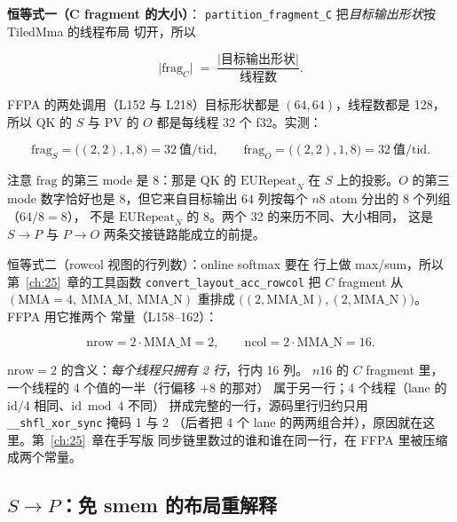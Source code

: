 \textbf{恒等式一（C fragment 的大小）}：
\texttt{partition\_\allowbreak{}fragment\_\allowbreak{}C} 把\emph{目标输出形状}按 TiledMma 的线程布局
切开，所以

\begin{equation}
  \bigl|\mathrm{frag}_C\bigr| \;=\;
  \frac{\bigl|\text{目标输出形状}\bigr|}{\text{线程数}} .
  \label{eq:26-csize}
\end{equation}

FFPA 的两处调用（L152 与 L218）目标形状都是 $(64,64)$，线程数都是 128，
所以 QK 的 $S$ 与 PV 的 $O$ 都是每线程 32 个 f32。实测：

\begin{equation}
  \mathrm{frag}_S = \bigl((2,2),1,8\bigr) = 32\ \text{值/tid},\qquad
  \mathrm{frag}_O = \bigl((2,2),1,8\bigr) = 32\ \text{值/tid} .
  \label{eq:26-frag32}
\end{equation}

注意 $\mathrm{frag}$ 的第三 mode 是 8：那是 QK 的 $\mathrm{EURepeat}_N$
在 $S$ 上的投影。$O$ 的第三 mode 数字恰好也是 8，但它来自目标输出
$64$ 列按每个 $n8$ atom 分出的 $8$ 个列组（$64/8{=}8$），
不是 $\mathrm{EURepeat}_N$ 的 $8$。两个 32 的来历不同、大小相同，
这是 $S\to P$ 与 $P\to O$ 两条交接链路能成立的前提。

恒等式二（rowcol 视图的行列数）：online softmax 要在
行上做 max/sum，所以第~\ref{ch:25}~章的工具函数
\texttt{convert\_\allowbreak{}layout\_\allowbreak{}acc\_\allowbreak{}rowcol} 把 $C$ fragment 从
$(\mathrm{MMA}=4,\ \mathrm{MMA\_M},\ \mathrm{MMA\_N})$ 重排成
$\bigl((2,\mathrm{MMA\_M}), (2,\mathrm{MMA\_N})\bigr)$。FFPA 用它推两个
常量（L158--162）：

\begin{equation}
  \mathrm{nrow} = 2\cdot\mathrm{MMA\_M} = 2, \qquad
  \mathrm{ncol} = 2\cdot\mathrm{MMA\_N} = 16 .
  \label{eq:26-rowcol}
\end{equation}

$\mathrm{nrow}=2$ 的含义：\emph{每个线程只拥有 2 行}，行内 16 列。
$n16$ 的 $C$ fragment 里，一个线程的 4 个值的一半（行偏移 $+8$ 的那对）
属于另一行；4 个线程（lane 的 $\text{id}/4$ 相同、$\text{id}\bmod 4$ 不同）
拼成完整的一行，源码里行归约只用 \texttt{\_\allowbreak{}\_\allowbreak{}shfl\_\allowbreak{}xor\_\allowbreak{}sync} 掩码 1 与 2
（后者把 4 个 lane 的两两组合并），原因就在这里。第~\ref{ch:25}~章在手写版
同步链里数过的谁和谁在同一行，在 FFPA 里被压缩成两个常量。

\subsection{$S \to P$：免 smem 的布局重解释}

